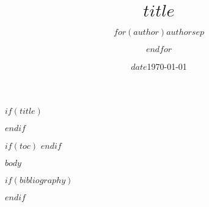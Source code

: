 \documentclass[a4paper,12pt]{article}
\title{$title$}
\author{$for(author)$$author$$sep$ \and $endfor$}
\date{$date$}
\date{\today}
\begin{document}
$if(title)$
\maketitle
$endif$

$if(toc)$
\tableofcontents
\newpage
$endif$

$body$

$if(bibliography)$


$endif$
\end{document}
